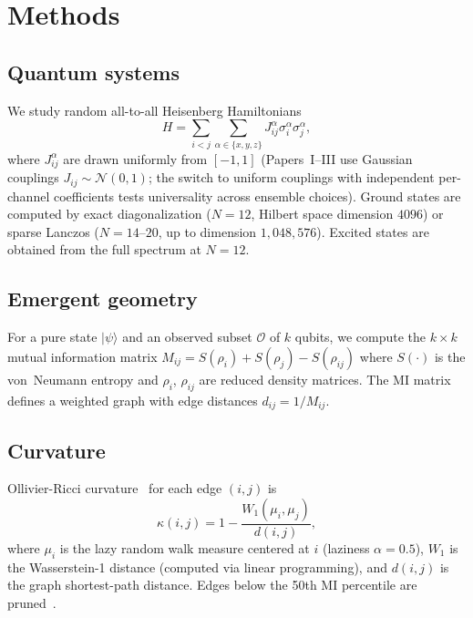 \documentclass[aps,pra,twocolumn,superscriptaddress,floatfix]{revtex4-2}
\begin{document}
\section{Methods}
\label{sec:methods}

\subsection{Quantum systems}

We study random all-to-all Heisenberg Hamiltonians
\begin{equation}
H = \sum_{i < j} \sum_{\alpha \in \{x,y,z\}} J_{ij}^\alpha
\sigma_i^\alpha \sigma_j^\alpha,
\end{equation}
where $J_{ij}^\alpha$ are drawn uniformly from $[-1, 1]$
(Papers~I--III use Gaussian couplings $J_{ij} \sim \mathcal{N}(0,1)$;
the switch to uniform couplings with independent per-channel
coefficients tests universality across ensemble choices).
Ground states are computed by exact diagonalization ($N = 12$,
Hilbert space dimension $4096$) or sparse Lanczos ($N = 14$--$20$,
up to dimension $1{,}048{,}576$).
Excited states are obtained from the full spectrum at $N = 12$.

\subsection{Emergent geometry}

For a pure state $|\psi\rangle$ and an observed subset $\mathcal{O}$
of $k$ qubits, we compute the $k \times k$ mutual information
matrix $M_{ij} = S(\rho_i) + S(\rho_j) - S(\rho_{ij})$
where $S(\cdot)$ is the von~Neumann entropy and $\rho_i$, $\rho_{ij}$
are reduced density matrices.  The MI matrix defines a weighted
graph with edge distances $d_{ij} = 1/M_{ij}$.

\subsection{Curvature}

Ollivier-Ricci curvature~\cite{ollivier2009} for each edge $(i,j)$ is
\begin{equation}
\kappa(i,j) = 1 - \frac{W_1(\mu_i, \mu_j)}{d(i,j)},
\label{eq:orc}
\end{equation}
where $\mu_i$ is the lazy random walk measure centered at $i$
(laziness $\alpha = 0.5$), $W_1$ is the Wasserstein-1 distance
(computed via linear programming), and $d(i,j)$ is the
graph shortest-path distance.  Edges below the 50th MI percentile
are pruned~\cite{glass2026plc2}.
\end{document}
